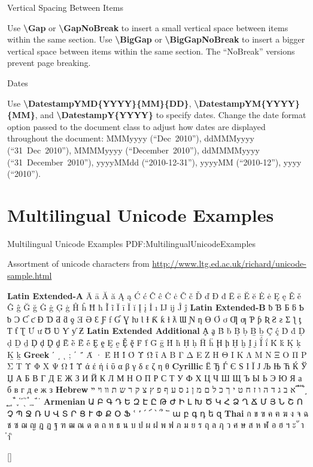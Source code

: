 \documentclass[letterpaper,MMMyyyy,nonstop]{simpleresumecv}
\newcommand{\CodeCommand}[1]{\mbox{\textbf{\textbackslash{#1}}}}
\begin{document}
\begin{body}
\Gap
\BulletItem
Vertical Spacing Between Items
\begin{detail}
\SubBulletItem
Use \CodeCommand{Gap} or \CodeCommand{GapNoBreak} to insert a small vertical space between items within the same section.
\SubBulletItem
Use \CodeCommand{BigGap} or \CodeCommand{BigGapNoBreak} to insert a bigger vertical space between items within the same section.
\SubBulletItem
The ``NoBreak'' versions prevent page breaking.
\end{detail}

\Gap
\BulletItem
Dates
\begin{detail}
\SubBulletItem
Use
\CodeCommand{DatestampYMD\{YYYY\}\{MM\}\{DD\}},
\CodeCommand{DatestampYM\{YYYY\}\{MM\}}, and
\CodeCommand{DatestampY\{YYYY\}}
to specify dates.
\SubBulletItem
Change the date format option passed to the document class to adjust how dates are displayed throughout the document:
MMMyyyy (``Dec~2010''),
ddMMMyyyy (``31~Dec~2010''),
MMMMyyyy (``December~2010''),
ddMMMMyyyy (``31~December~2010''),
yyyyMMdd (``2010-12-31''),
yyyyMM (``2010-12''),
yyyy (``2010'').
\end{detail}



\section
{Multilingual Unicode Examples}
{Multilingual Unicode Examples}
{PDF:MultilingualUnicodeExamples}

\BulletItem
Assortment of unicode characters from
\href{http://www.ltg.ed.ac.uk/~richard/unicode-sample.html}
{http://www.ltg.ed.ac.uk/{\TildeSymbol}richard/unicode-sample.html}

\begin{detail}
\SubItem
\textbf{Latin Extended-A}
Ā ā Ă ă Ą ą Ć ć Ĉ ĉ Ċ ċ Č č Ď ď Đ đ Ē ē Ĕ ĕ Ė ė Ę ę Ě ě Ĝ ĝ Ğ ğ Ġ ġ Ģ ģ Ĥ ĥ Ħ ħ Ĩ ĩ Ī ī Ĭ ĭ Į į İ ı Ĳ ĳ Ĵ ĵ
\textbf{Latin Extended-B}
ƀ Ɓ Ƃ ƃ Ƅ ƅ Ɔ Ƈ ƈ Ɖ Ɗ Ƌ ƌ ƍ Ǝ Ə Ɛ Ƒ ƒ Ɠ Ɣ ƕ Ɩ Ɨ Ƙ ƙ ƚ ƛ Ɯ Ɲ ƞ Ɵ Ơ ơ Ƣ ƣ Ƥ ƥ Ʀ Ƨ ƨ Ʃ ƪ ƫ Ƭ ƭ Ʈ Ư ư Ʊ Ʋ Ƴ ƴ Ƶ
\textbf{Latin Extended Additional}
Ḁ ḁ Ḃ ḃ Ḅ ḅ Ḇ ḇ Ḉ ḉ Ḋ ḋ Ḍ ḍ Ḏ ḏ Ḑ ḑ Ḓ ḓ Ḕ ḕ Ḗ ḗ Ḙ ḙ Ḛ ḛ Ḝ ḝ Ḟ ḟ Ḡ ḡ Ḣ ḣ Ḥ ḥ Ḧ ḧ Ḩ ḩ Ḫ ḫ Ḭ ḭ Ḯ ḯ Ḱ ḱ Ḳ ḳ Ḵ ḵ
\textbf{Greek}
ʹ ͵ ͺ ; ΄ ΅ Ά · Έ Ή Ί Ό Ύ Ώ ΐ Α Β Γ Δ Ε Ζ Η Θ Ι Κ Λ Μ Ν Ξ Ο Π Ρ Σ Τ Υ Φ Χ Ψ Ω Ϊ Ϋ ά έ ή ί ΰ α β γ δ ε ζ η θ
\textbf{Cyrillic}
Ё Ђ Ѓ Є Ѕ І Ї Ј Љ Њ Ћ Ќ Ў Џ А Б В Г Д Е Ж З И Й К Л М Н О П Р С Т У Ф Х Ц Ч Ш Щ Ъ Ы Ь Э Ю Я а б в г д е ж з
\textbf{Hebrew}
א ב ג ד ה ו ז ח ט י ך כ ל ם מ ן נ ס ע ף פ ץ צ ק ר ש ת װ ױ ײ ֝ ֞ ֟ ֠ ֡ ֣ ֤ ֥ ֦ ֧ ֨ ֩ ֪ ֫ ֬ ֭ ֮ ֯ ְ ֱ ֒ ֓ ֔
\textbf{Armenian}
{\UseSecondaryFont
Ա Բ Գ Դ Ե Զ Է Ը Թ Ժ Ի Լ Խ Ծ Կ Հ Ձ Ղ Ճ Մ Յ Ն Շ Ո Չ Պ Ջ Ռ Ս Վ Տ Ր Ց Ւ Փ Ք Օ Ֆ ՙ ՚ ՛ ՜ ՝ ՞ ՟ ա բ գ դ ե զ}
\textbf{Thai}
{\UseSecondaryFont
ก ข ฃ ค ฅ ฆ ง จ ฉ ช ซ ฌ ญ ฎ ฏ ฐ ฑ ฒ ณ ด ต ถ ท ธ น บ ป ผ ฝ พ ฟ ภ ม ย ร ฤ ล ฦ ว ศ ษ ส ห ฬ อ ฮ ฯ ะ ั า ำ ิ}
\end{detail}
\fi

\end{body}


\UseNoteFont%
\null\hfill%
[\textit{\CVNote}]%
\hspace{2.0mm}\null
\end{document}
